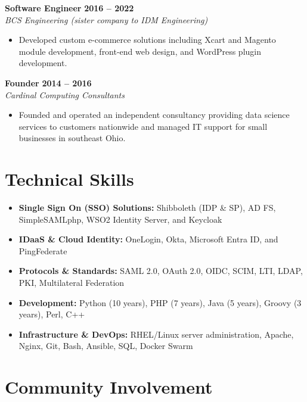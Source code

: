 \documentclass[12pt, letterpaper]{article}
\begin{document}
\vspace{2pt}

\textbf{Software Engineer} \hfill \textbf{2016 -- 2022} \\
\textit{BCS Engineering (sister company to IDM Engineering)}
\begin{itemize}
  \item Developed custom e-commerce solutions including Xcart and Magento module development, front-end web design, and WordPress plugin development.
\end{itemize}

\vspace{2pt}

\textbf{Founder} \hfill \textbf{2014 -- 2016} \\
\textit{Cardinal Computing Consultants}
\begin{itemize}
  \item Founded and operated an independent consultancy providing data science services to customers nationwide and managed IT support for small businesses in southeast Ohio.
\end{itemize}

\section{Technical Skills}

\begin{itemize}[leftmargin=0em, label={}]
  \item \textbf{Single Sign On (SSO) Solutions:} Shibboleth (IDP \& SP), AD FS, SimpleSAMLphp, WSO2 Identity Server, and Keycloak
  \item \textbf{IDaaS \& Cloud Identity:} OneLogin, Okta, Microsoft Entra ID, and PingFederate
  \item \textbf{Protocols \& Standards:} SAML 2.0, OAuth 2.0, OIDC, SCIM, LTI, LDAP, PKI, Multilateral Federation
  \item \textbf{Development:} Python (10 years), PHP (7 years), Java (5 years), Groovy (3 years), Perl, C++
  \item \textbf{Infrastructure \& DevOps:} RHEL/Linux server administration, Apache, Nginx, Git, Bash, Ansible, SQL, Docker Swarm
\end{itemize}

\section{Community Involvement}
\end{document}

